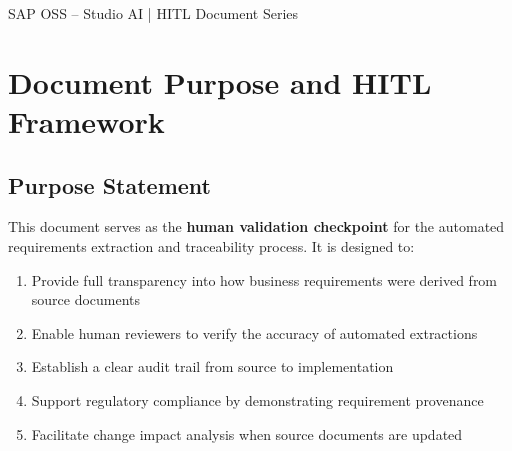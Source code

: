 \documentclass[11pt,a4paper]{article}
\begin{document}
\begin{titlepage}
\vspace{1.5cm}

\begin{abstract}
\noindent
This document provides a \textbf{human-in-the-loop} traceability matrix for the Trial Balance 
review process. It maps the complete lineage from source documents (business cases, DOIs, 
process maps) through extracted machine-readable formats, business requirements derivation, 
specification development, and schema definitions. Each requirement is traceable to its 
source document section, and each specification element is traceable to its requirement. 
This enables human reviewers to validate the completeness and accuracy of the automated 
extraction and requirement derivation process.
\end{abstract}

\vfill
{\small SAP OSS -- Studio AI | HITL Document Series}

\end{titlepage}


\tableofcontents
\newpage


\section{Document Purpose and HITL Framework}

\subsection{Purpose Statement}

This document serves as the \textbf{human validation checkpoint} for the automated 
requirements extraction and traceability process. It is designed to:

\begin{enumerate}[noitemsep]
    \item Provide full transparency into how business requirements were derived from source documents
    \item Enable human reviewers to verify the accuracy of automated extractions
    \item Establish a clear audit trail from source to implementation
    \item Support regulatory compliance by demonstrating requirement provenance
    \item Facilitate change impact analysis when source documents are updated
\end{enumerate}
\end{document}
